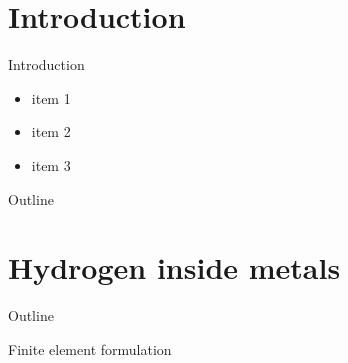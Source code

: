 \documentclass[9pt]{beamer}
\author[Daniella LOPES PINTO]{Daniella LOPES PINTO \textsuperscript{1,2*} \\ 
\texttt{\textcolor{black}{daniella.lopes\_pinto@minesparis.psl.eu}}}
\subtitle{\LARGE Finite element models for the study of hydrogen embrittlement of steel structures}
\institute
{\textbf{Academic advisor}: Jacques BESSON \textsuperscript{1} \\
\vspace{0.25cm}
\textbf{Industrial advisors}: Nikolay OSIPOV \textsuperscript{2} \\
\vspace{0.4cm}
{\textsuperscript{1} Centre des Matériaux, Mines Paris} \\
\vspace{0.15cm}
\textsuperscript{2} Transvalor S.A. \\
\vspace{0.2cm}
\center{\textbf{Thesis defense} \\ \small March 7\textsuperscript{th} 2025} 
\center{\textcolor{white}{XXXXXXXX}}}
\begin{document}
\begin{frame}[plain]
    \maketitle
\end{frame}

\section{Introduction}


\begin{frame}{Introduction}

    \begin{itemize}
        \item item 1
        \item item 2
        \item item 3
    \end{itemize}

\end{frame}


\begin{frame}{Outline}
    \tableofcontents
\end{frame}


\section{Hydrogen inside metals}

\begin{frame}{Outline}
    \tableofcontents[
        currentsubsection,
        hideothersubsections,
        sectionstyle=show/shaded,
        subsectionstyle=show/shaded,
    ]
\end{frame}


\begin{frame}{Finite element formulation}

\end{frame}


\section*{}
\end{document}
